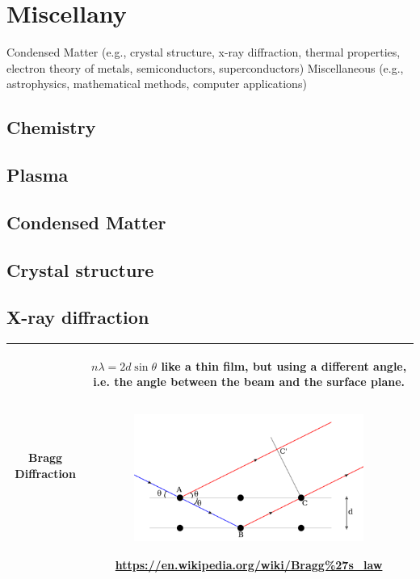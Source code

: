 
\section{Miscellany}
Condensed Matter (e.g., crystal
structure, x-ray diffraction, thermal
properties, electron theory of metals,
semiconductors, superconductors)
Miscellaneous (e.g., astrophysics, mathematical
methods, computer applications)

\subsection{Chemistry}


\subsection{Plasma}

\subsection{Condensed Matter} 


\subsection{Crystal structure} 


\subsection{X-ray diffraction} 
\center
\begin{tabular}{|c|c|}
\hline

Bragg Diffraction &

\begin{minipage}{0.6\textwidth}

 $n \lambda = 2d \sin \theta$ like a thin film, but using a different angle, i.e. the angle between the beam and the surface plane.
 
 \includegraphics[width=75mm, height=50mm]{images/Bragg.png}
      \tiny \url{https://en.wikipedia.org/wiki/Bragg\%27s_law}
\end{minipage}

\\ \hline
\end{tabular}
\flushleft

